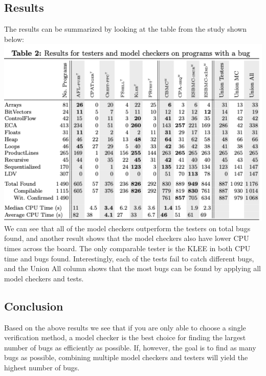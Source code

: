\documentclass[a4paper]{article}
\begin{document}
\subsection{Results}
The results can be summarized by looking at the table from the study shown below:
\linebreak
\includegraphics{results}
\linebreak
We can see that all of the model checkers outperform the testers on total bugs found, and another result shows that the model checkers also have lower CPU times across the board. The only comparable tester is the KLEE in both CPU time and bugs found. Interestingly, each of the tests fail to catch different bugs, and the Union All column shows that the most bugs can be found by applying all model checkers and tests.

\subsection{Conclusion}
Based on the above results we see that if you are only able to choose a single verification method, a model checker is the best choice for finding the largest number of bugs as efficiently as possible. If, however, the goal is to find as many bugs as possible, combining multiple model checkers and testers will yield the highest number of bugs.
\end{document}
